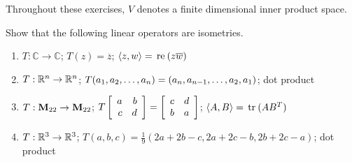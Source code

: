 \begin{multicols}{2}
\noindent Throughout these exercises, $V$ denotes a finite dimensional inner product space.

\vspace{1em}
\begin{ex}
Show that the following linear operators are isometries.

\begin{enumerate}[label={\alph*.}]
\item $ T : \mathbb{C} \to \mathbb{C}$; $T(z) = \overline{z}$; $\langle z, w \rangle = \thinspace\operatorname{re\medspace}(z\overline{w}) $

\item $ T : \mathbb{R}^n \to \mathbb{R}^n$; $T(a_1, a_2, \dots, a_n) \\ = (a_n, a_{n - 1}, \dots, a_2, a_1)$;  dot product

\item $ T : \textbf{M}_{22} \to \textbf{M}_{22}$; $T
\left[ \begin{array}{rr}
a & b \\
c & d
\end{array} \right]
=
\left[ \begin{array}{rr}
c & d \\
b & a
\end{array} \right]$; $\langle A, B \rangle = \thinspace\operatorname{tr\medspace}(AB^T)$

\item $ T : \mathbb{R}^3 \to \mathbb{R}^3$; $T(a, b, c) = \frac{1}{9}(2a + 2b -c, 2a + 2c - b, 2b + 2c - a)$; dot product

\end{enumerate}
\end{ex}


\end{multicols}
